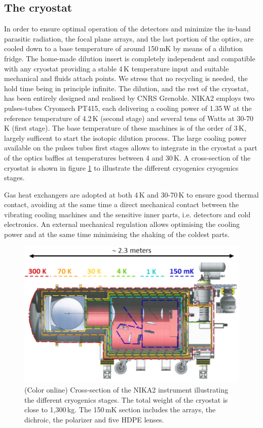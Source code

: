 \documentclass[]{aa} %
\begin{document}
 \subsection{The cryostat}

In order to ensure optimal operation of the detectors and minimize the in-band parasitic radiation, the focal plane arrays, and the last portion of the optics, are cooled down to a base temperature of around 150\,mK by means of a dilution fridge. The home-made dilution insert is completely independent and compatible with any cryostat providing a stable 4\,K temperature input and suitable mechanical and fluids attach points. We stress that no recycling is needed, the hold time being in principle infinite. The dilution, and the rest of the cryostat, has been entirely designed and realised by CNRS Grenoble. NIKA2 employs two pulses-tubes Cryomech PT415, each delivering a cooling power of 1.35\,W at the reference temperature of 4.2\,K (second stage) and several tens of Watts at 30-70\,K (first stage). The base temperature of these machines is of the order of 3\,K, largely sufficent to start the isotopic dilution process. The large cooling power available on the pulses tubes first stages allows to integrate in the cryostat a part of the optics baffles at temperatures between 4 and 30\,K. A cross-section of the cryostat is shown in figure \ref{Cryostat_cryo} to illustrate the different cryogenics cryogenics stages.

Gas heat exchangers are adopted at both 4\,K and 30-70\,K to ensure good thermal contact, avoiding at the same time a direct mechanical contact between the vibrating cooling machines and the sensitive inner parts, i.e. detectors and cold electronics. An external mechanical regulation allows optimising the cooling power and at the same time minimising the shaking of the coldest parts. 

\begin{figure}[h]
   \centering
   \includegraphics[width=.95\linewidth]{NIKA2_cryoStages.png}
      \caption{(Color online) Cross-section of the NIKA2 instrument illustrating the different cryogenics stages. The total weight of the cryostat is close to 1,300\,kg. The 150\,mK section includes the arrays, the dichroic, the polarizer and five HDPE lenses.}
         \label{Cryostat_cryo}
\end{figure}
\end{document}
